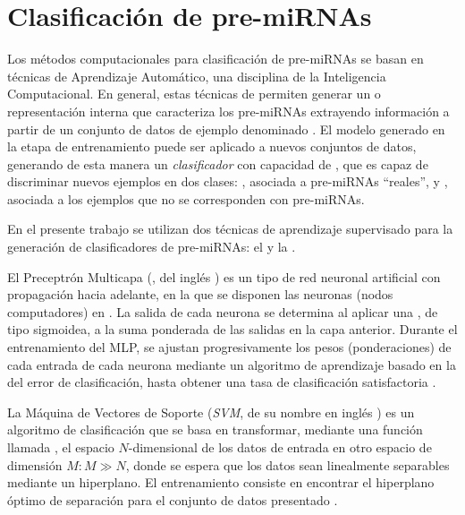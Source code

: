 %
%
%
\section{Clasificación de pre-miRNAs}
%
Los métodos computacionales para clasificación de pre-miRNAs se basan
en técnicas de Aprendizaje Automático, una disciplina
de la Inteligencia Computacional.  En general, estas técnicas de
 permiten generar un  o
representación interna que caracteriza los pre-miRNAs extrayendo
información a partir de un conjunto de datos de ejemplo denominado
.  El modelo generado en la etapa de
entrenamiento puede ser aplicado a nuevos conjuntos de datos,
generando de esta manera un \emph{clasificador} con capacidad de
, que es capaz de discriminar nuevos ejemplos en dos
clases: , asociada a pre-miRNAs ``reales'', y
, asociada a los ejemplos que no se corresponden con
pre-miRNAs.

En el presente trabajo se utilizan dos técnicas de aprendizaje
supervisado para la generación de clasificadores de pre-miRNAs: el
 \cite{mlp1,mlp2} y la  \cite{svm}.

El Preceptrón Multicapa (, del inglés ) es un tipo de red neuronal artificial con propagación
hacia adelante, en la que se disponen las neuronas (nodos
computadores) en . La salida de cada neurona se determina al
aplicar una , de tipo sigmoidea, a la suma
ponderada de las salidas en la capa anterior. Durante el entrenamiento
del MLP, se ajustan progresivamente los pesos (ponderaciones) de cada
entrada de cada neurona mediante un algoritmo de aprendizaje basado en
la  del error de clasificación, hasta
obtener una tasa de clasificación satisfactoria \cite{jain}.

La Máquina de Vectores de Soporte (\emph{SVM}, de su nombre en inglés
) es un algoritmo de clasificación que se
basa en transformar, mediante una función llamada , el
espacio $N$-dimensional de los datos de entrada en otro espacio de
dimensión $M: M\gg N$, donde se espera que los datos sean linealmente
separables mediante un hiperplano. El entrenamiento consiste en
encontrar el hiperplano óptimo de separación para el conjunto de datos
presentado \cite{bottou}.
